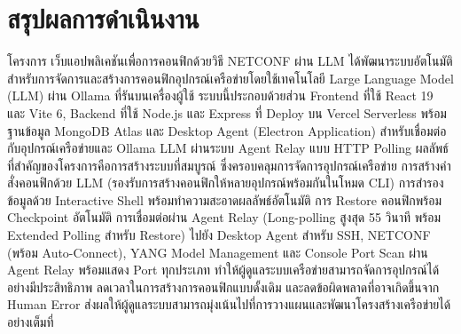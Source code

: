 
\section{สรุปผลการดำเนินงาน}
\hspace*{1.3em}
โครงการ เว็บแอปพลิเคชันเพื่อการคอนฟิกด้วยวิธี NETCONF ผ่าน LLM ได้พัฒนาระบบอัตโนมัติสำหรับการจัดการและสร้างการคอนฟิกอุปกรณ์เครือข่ายโดยใช้เทคโนโลยี Large Language Model (LLM) ผ่าน Ollama ที่รันบนเครื่องผู้ใช้
ระบบนี้ประกอบด้วยส่วน Frontend ที่ใช้ React 19 และ Vite 6, Backend ที่ใช้ Node.js และ Express ที่ Deploy บน Vercel Serverless พร้อมฐานข้อมูล MongoDB Atlas และ Desktop Agent (Electron Application) สำหรับเชื่อมต่อกับอุปกรณ์เครือข่ายและ Ollama LLM ผ่านระบบ Agent Relay แบบ HTTP Polling
ผลลัพธ์ที่สำคัญของโครงการคือการสร้างระบบที่สมบูรณ์ ซึ่งครอบคลุมการจัดการอุปกรณ์เครือข่าย การสร้างคำสั่งคอนฟิกด้วย LLM (รองรับการสร้างคอนฟิกให้หลายอุปกรณ์พร้อมกันในโหมด CLI) การสำรองข้อมูลด้วย Interactive Shell พร้อมทำความสะอาดผลลัพธ์อัตโนมัติ การ Restore คอนฟิกพร้อม Checkpoint อัตโนมัติ การเชื่อมต่อผ่าน Agent Relay (Long-polling สูงสุด 55 วินาที พร้อม Extended Polling สำหรับ Restore) ไปยัง Desktop Agent สำหรับ SSH, NETCONF (พร้อม Auto-Connect), YANG Model Management และ Console Port Scan ผ่าน Agent Relay พร้อมแสดง Port ทุกประเภท
ทำให้ผู้ดูแลระบบเครือข่ายสามารถจัดการอุปกรณ์ได้อย่างมีประสิทธิภาพ ลดเวลาในการสร้างการคอนฟิกแบบดั้งเดิม และลดข้อผิดพลาดที่อาจเกิดขึ้นจาก Human Error
ส่งผลให้ผู้ดูแลระบบสามารถมุ่งเน้นไปที่การวางแผนและพัฒนาโครงสร้างเครือข่ายได้อย่างเต็มที่
